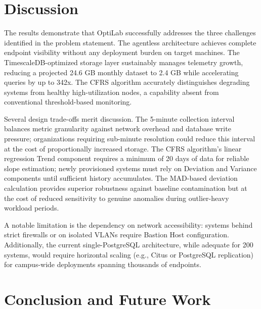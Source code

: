 \documentclass{ieeeaccess}
\begin{document}
\section{Discussion}
\label{sec:discussion}

The results demonstrate that OptiLab successfully addresses the three challenges identified in the problem statement. The agentless architecture achieves complete endpoint visibility without any deployment burden on target machines. The TimescaleDB-optimized storage layer sustainably manages telemetry growth, reducing a projected 24.6 GB monthly dataset to 2.4 GB while accelerating queries by up to 342x. The CFRS algorithm accurately distinguishes degrading systems from healthy high-utilization nodes, a capability absent from conventional threshold-based monitoring.

Several design trade-offs merit discussion. The 5-minute collection interval balances metric granularity against network overhead and database write pressure; organizations requiring sub-minute resolution could reduce this interval at the cost of proportionally increased storage. The CFRS algorithm's linear regression Trend component requires a minimum of 20 days of data for reliable slope estimation; newly provisioned systems must rely on Deviation and Variance components until sufficient history accumulates. The MAD-based deviation calculation provides superior robustness against baseline contamination but at the cost of reduced sensitivity to genuine anomalies during outlier-heavy workload periods.

A notable limitation is the dependency on network accessibility: systems behind strict firewalls or on isolated VLANs require Bastion Host configuration. Additionally, the current single-PostgreSQL architecture, while adequate for 200 systems, would require horizontal scaling (e.g., Citus or PostgreSQL replication) for campus-wide deployments spanning thousands of endpoints.


\section{Conclusion and Future Work}
\label{sec:conclusion}
\end{document}
